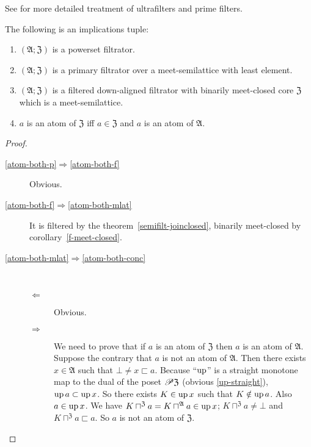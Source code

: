 See \cite{primeidealsandfilters,primefilters} for more detailed treatment
of ultrafilters and prime filters.
\begin{thm}
\label{atom-both}The following is an implications tuple:
\begin{enumerate}
\item \label{atom-both-p}$(\mathfrak{A};\mathfrak{Z})$ is a powerset filtrator.
\item \label{atom-both-f}$(\mathfrak{A};\mathfrak{Z})$ is a primary filtrator
over a meet-semilattice with least element.
\item \label{atom-both-mlat}$(\mathfrak{A};\mathfrak{Z})$ is a filtered
down-aligned filtrator with binarily meet-closed core $\mathfrak{Z}$
which is a meet-semilattice.
\item \label{atom-both-conc}$a$ is an atom of $\mathfrak{Z}$ iff $a\in\mathfrak{Z}$
and $a$ is an atom of $\mathfrak{A}$.
\end{enumerate}
\end{thm}
\begin{proof}
~
\begin{description}
\item [{\ref{atom-both-p}$\Rightarrow$\ref{atom-both-f}}] Obvious.
\item [{\ref{atom-both-f}$\Rightarrow$\ref{atom-both-mlat}}] It is filtered
by the theorem~\ref{semifilt-joinclosed}, binarily meet-closed by
corollary~\ref{f-meet-closed}.
\item [{\ref{atom-both-mlat}$\Rightarrow$\ref{atom-both-conc}}] ~

\begin{description}
\item [{$\Leftarrow$}] Obvious.
\item [{$\Rightarrow$}] We need to prove that if $a$ is an atom of $\mathfrak{Z}$
then $a$ is an atom of $\mathfrak{A}$. Suppose the contrary that
$a$ is not an atom of $\mathfrak{A}$. Then there exists $x\in\mathfrak{A}$
such that $\bot\ne x\sqsubset a$. Because ``$\operatorname{up}$'' is a straight
monotone map to the dual of the poset $\mathscr{P}\mathfrak{Z}$ (obvious
\ref{up-straight}), $\operatorname{up} a\subset\operatorname{up} x$. So there exists $K\in\operatorname{up} x$
such that $K\notin\operatorname{up} a$. Also $a\in\operatorname{up} x$. We have $K\sqcap^{\mathfrak{Z}}a=K\sqcap^{\mathfrak{A}}a\in\operatorname{up} x$;
$K\sqcap^{\mathfrak{Z}}a\ne\bot$ and $K\sqcap^{\mathfrak{Z}}a\sqsubset a$.
So $a$ is not an atom of $\mathfrak{Z}$.
\end{description}
\end{description}
\end{proof}
